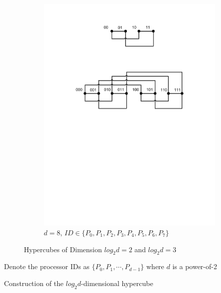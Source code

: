 \documentclass{iacrtrans}
\theoremstyle{plain}
\begin{document}
\begin{figure}[!tb]
\begin{subfigure}[t]{0.5\textwidth}\centering
\includegraphics[width=\textwidth]{./fig/HyperCube2.pdf}
\caption{$d=8$, $ID\in\{P_0,P_1,P_2,P_3,P_4,P_5,P_6,P_7\}$}
\label{fig:hypercube8}
\end{subfigure}
\caption{Hypercubes of Dimension $log_2d=2$ and $log_2d=3$}
\end{figure}

\begin{algorithm}[!tbh]
 \DontPrintSemicolon %
    Denote the processor IDs as $\{P_0,P_1,\cdots,P_{d-1}\}$ where $d$ is a power-of-2\;
 \caption{Construction of the $log_2d$-dimensional hypercube}\label{alg:descript_hypercube}
\end{algorithm}
\end{document}
